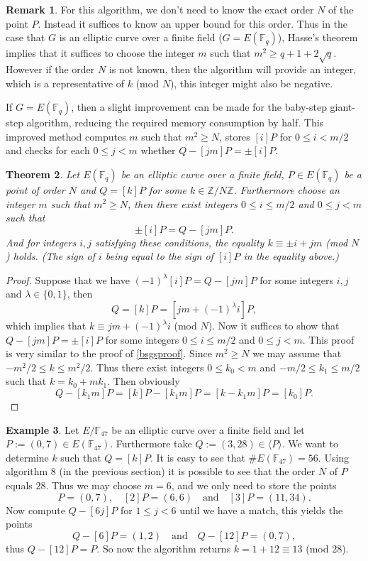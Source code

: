 \documentclass{article}
\numberwithin{equation}{section}
\newtheorem{theorem}{Theorem}[subsection]
\theoremstyle{definition}
\newtheorem{example}[theorem]{Example}
\newtheorem{remark}[theorem]{Remark}
\newcommand{\ZZ}{{\mathbb Z}} %
\newcommand{\Zmod}[1]{\ZZ / #1\ZZ} %
\newcommand{\FF}[1]{{\mathbb F}_{#1}} %
\newcommand{\grgen}[1]{\langle #1 \rangle} %
\begin{document}
\begin{remark}
For this algorithm, we don't need to know the exact order $N$ of the point $P$. Instead it suffices to know an upper bound for this order. Thus in the case that $G$ is an elliptic curve over a finite field ($G=E(\FF{q})$), Hasse's theorem implies that it suffices to choose the integer $m$ such that $m^2 \geq q+1 + 2\sqrt{q}$. However if the order $N$ is not known, then the algorithm will provide an integer, which is a representative of $k$ (mod $N$), this integer might also be negative. 
\end{remark}

If $G=E(\FF{q})$, then a slight improvement can be made for the baby-step giant-step algorithm, reducing the required memory consumption by half. This improved method computes $m$ such that $m^2 \geq N$, stores $[i]P$ for $0 \leq i < m/2$ and checks for each $0 \leq j < m$ whether $Q-[jm]P = \pm [i]P$.

\begin{theorem}
Let $E(\FF{q})$ be an elliptic curve over a finite field, $P\in E(\FF{q})$ be a point of order $N$ and $Q = [k]P$ for some $k \in \Zmod{N}$. Furthermore choose an integer $m$ such that $m^2 \geq N$, then there exist integers $0 \leq i \leq m/2$ and $0 \leq j < m$ such that $$\pm [i] P = Q - [jm]P.$$ And for integers $i,j$ satisfying these conditions, the equality $k \equiv \pm i + jm$ (mod $N$) holds. (The sign of $i$ being equal to the sign of $[i]P$ in the equality above.)
\end{theorem}

\begin{proof}
Suppose that we have $(-1)^\lambda [i]P=Q-[jm]P$ for some integers $i,j$ and $\lambda \in \{0,1\}$, then $$Q=[k]P = [jm+(-1)^\lambda i]P,$$ which implies that $k \equiv jm+(-1)^\lambda i$ (mod $N$). Now it suffices to show that $Q-[jm]P = \pm [i]P$ for some integers $0 \leq i \leq m/2$ and $0 \leq j < m$. This proof is very similar to the proof of \ref{bsgsproof}. Since $m^2 \geq N$ we may assume that $-m^2/2 \leq k \leq m^2/2$. Thus there exist integers $0 \leq k_0 < m$ and $-m/2 \leq k_1 \leq m/2$ such that $k = k_0+mk_1$. Then obviously $$Q-[k_1m]P=[k]P-[k_1m]P=[k-k_1m]P=[k_0]P.$$
\end{proof}

\begin{example}
Let $E/\FF{47}$ be an elliptic curve over a finite field and let $P:=(0,7) \in E(\FF{47})$. Furthermore take $Q:=(3,28) \in \grgen{P}$. We want to determine $k$ such that $Q=[k]P$. It is easy to see that $\#E(\FF{47})=56$. Using algorithm 8 (in the previous section) it is possible to see that the order $N$ of $P$ equals $28$. Thus we may choose $m=6$, and we only need to store the points $$P=(0,7), \quad [2]P=(6,6)\quad \text{and} \quad [3]P=(11,34).$$ Now compute $Q-[6j]P$ for $1 \leq j < 6$ until we have a match, this yields the points $$Q-[6]P=(1,2)\quad \text{and} \quad Q-[12]P=(0,7),$$ thus $Q-[12]P=P$. So now the algorithm returns $k = 1+12\equiv13$ (mod 28).
\end{example}
\end{document}
